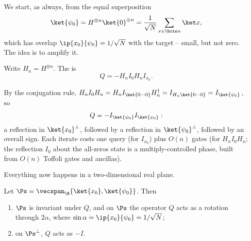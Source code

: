 We start, as always, from the equal superposition
$$\ket{\psi_0} = H^{\otimes n}\ket{0}^{\otimes n} = \frac{1}{\sqrt N}\sum_{x\in\bits n}\ket x,$$
which has overlap $\ip{x_0}{\psi_0} = 1/\sqrt N$ with the target -- small, but not zero. The idea is to amplify it.

\begin{definition}
	Write $H_n = H^{\otimes n}$. The  is
	$$Q = -H_nI_0H_nI_{x_0}.$$
\end{definition}

By the conjugation rule, $H_nI_0H_n = H_nI_{\ket{0\cdots0}}H_n^\dagger = I_{H_n\ket{0\cdots0}} = I_{\ket{\psi_0}}$, so
$$Q = -I_{\ket{\psi_0}}I_{\ket{x_0}}:$$
a reflection in $\ket{x_0}^\perp$, followed by a reflection in $\ket{\psi_0}^\perp$, followed by an overall sign. Each iterate costs one query (for $I_{x_0}$) plus $O(n)$ gates (for $H_n I_0 H_n$; the reflection $I_0$ about the all-zeros state is a multiply-controlled phase, built from $O(n)$ Toffoli gates and ancillas).

Everything now happens in a two-dimensional real plane.

\begin{theorem}
	Let $\Ps = \vecspan_\R\{\ket{x_0},\ket{\psi_0}\}$. Then
	\begin{enumerate}[label=(\roman*)]
		\item $\Ps$ is invariant under $Q$, and on $\Ps$ the operator $Q$ acts as a rotation through $2\alpha$, where $\sin\alpha = \ip{x_0}{\psi_0} = 1/\sqrt N$;
		\item on $\Ps^\perp$, $Q$ acts as $-I$.
	\end{enumerate}
\end{theorem}

